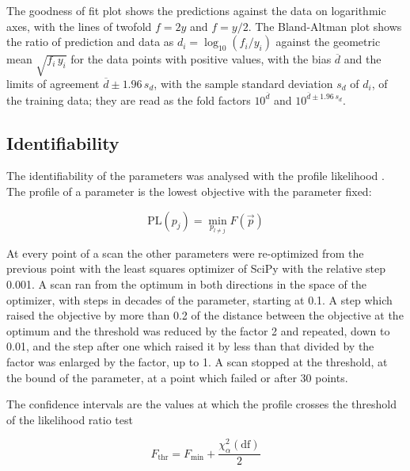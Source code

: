 The goodness of fit plot shows the predictions against the data on logarithmic axes, with the lines of twofold $f = 2y$ and $f = y/2$. The Bland-Altman plot \cite{Bland1986} shows the ratio of prediction and data as $d_i = \log_{10}(f_i / y_i)$ against the geometric mean $\sqrt{f_i\, y_i}$ for the data points with positive values, with the bias $\overline{d}$ and the limits of agreement $\overline{d} \pm 1.96\, s_d$, with the sample standard deviation $s_d$ of $d_i$, of the training data; they are read as the fold factors $10^{\overline{d}}$ and $10^{\overline{d} \pm 1.96\, s_d}$.

\subsection{Identifiability}

The identifiability of the parameters was analysed with the profile likelihood \cite{Raue2009,Kreutz2013}. The profile of a parameter is the lowest objective with the parameter fixed:

\begin{equation}
\mathrm{PL}(p_j) = \min_{p_{l \neq j}} F(\vec{p})
\end{equation}

At every point of a scan the other parameters were re-optimized from the previous point with the least squares optimizer of SciPy with the relative step 0.001. A scan ran from the optimum in both directions in the space of the optimizer, with steps in decades of the parameter, starting at 0.1. A step which raised the objective by more than 0.2 of the distance between the objective at the optimum and the threshold was reduced by the factor 2 and repeated, down to 0.01, and the step after one which raised it by less than that divided by the factor was enlarged by the factor, up to 1. A scan stopped at the threshold, at the bound of the parameter, at a point which failed or after 30 points.

The confidence intervals are the values at which the profile crosses the threshold of the likelihood ratio test

\begin{equation}
F_{\mathrm{thr}} = F_{\min} + \frac{\chi^2_{\alpha}(\mathrm{df})}{2}
\end{equation}

